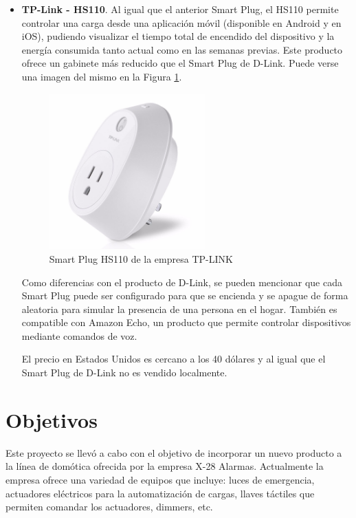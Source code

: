 \begin{itemize}
\item \textbf{TP-Link - HS110}. Al igual que el anterior Smart Plug, el HS110 permite controlar una carga desde una aplicación móvil (disponible en Android y en iOS), pudiendo visualizar el tiempo total de encendido del dispositivo y la energía consumida tanto actual como en las semanas previas. Este producto ofrece un gabinete más reducido que el Smart Plug de D-Link. Puede verse una imagen del mismo en la Figura \ref{fig:smartplug_tplink}.

\begin{figure}[h]
	\centering
	\includegraphics[width=6cm]{./Figures/1_2_TP-LINK-HS110.png}
	\caption{Smart Plug HS110 de la empresa TP-LINK}
	\label{fig:smartplug_tplink}
\end{figure}

Como diferencias con el producto de D-Link, se pueden mencionar que cada Smart Plug puede ser configurado para que se encienda y se apague de forma aleatoria para simular la presencia de una persona en el hogar. También es compatible con Amazon Echo, un producto que permite controlar dispositivos mediante comandos de voz.

El precio en Estados Unidos es cercano a los 40 dólares y al igual que el Smart Plug de D-Link no es vendido localmente.

\end{itemize}


\section{Objetivos}

Este proyecto se llevó a cabo con el objetivo de incorporar un nuevo producto a la línea de domótica ofrecida por la empresa X-28 Alarmas. Actualmente la empresa ofrece una variedad de equipos que incluye: luces de emergencia, actuadores eléctricos para la automatización de cargas, llaves táctiles que permiten comandar los actuadores, dimmers, etc.

